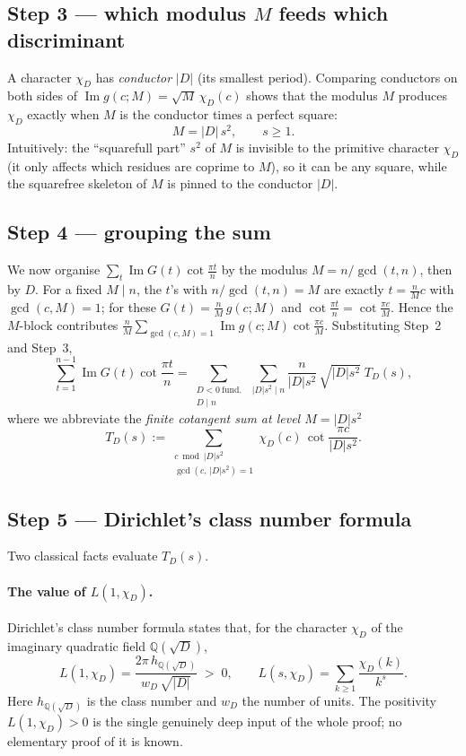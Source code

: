 \documentclass[11pt]{article}
\DeclareMathOperator{\Imag}{Im}
\begin{document}
\subsection{Step 3 --- which modulus $M$ feeds which discriminant}
A character $\chi_D$ has \emph{conductor} $|D|$ (its smallest period). Comparing conductors on both sides of
$\Imag g(c;M)=\sqrt M\,\chi_D(c)$ shows that the modulus $M$ produces $\chi_D$ exactly when $M$ is the conductor
times a perfect square:
\[
M=|D|\,s^2,\qquad s\ge1.
\]
Intuitively: the ``squarefull part'' $s^2$ of $M$ is invisible to the primitive character $\chi_D$ (it only
affects which residues are coprime to $M$), so it can be any square, while the squarefree skeleton of $M$ is
pinned to the conductor $|D|$.

\subsection{Step 4 --- grouping the sum}
We now organise $\sum_{t}\Imag G(t)\cot\frac{\pi t}{n}$ by the modulus $M=n/\gcd(t,n)$, then by $D$. For a fixed
$M\mid n$, the $t$'s with $n/\gcd(t,n)=M$ are exactly $t=\tfrac nM c$ with $\gcd(c,M)=1$; for these
$G(t)=\tfrac nM\,g(c;M)$ and $\cot\frac{\pi t}{n}=\cot\frac{\pi c}{M}$. Hence the $M$-block contributes
$\frac nM\sum_{\gcd(c,M)=1}\Imag g(c;M)\cot\frac{\pi c}{M}$. Substituting Step~2 and Step~3,
\[
\sum_{t=1}^{n-1}\Imag G(t)\cot\frac{\pi t}{n}
=\sum_{\substack{D<0\ \text{fund.}\\ D\mid n}}\ \sum_{|D|s^2\mid n}
\frac{n}{|D|s^2}\,\sqrt{|D|s^2}\;T_D(s),
\]
where we abbreviate the \emph{finite cotangent sum at level $M=|D|s^2$}
\[
T_D(s):=\sum_{\substack{c\bmod |D|s^2\\ \gcd(c,\,|D|s^2)=1}}\chi_D(c)\,\cot\frac{\pi c}{|D|s^2}.
\]

\subsection{Step 5 --- Dirichlet's class number formula}
Two classical facts evaluate $T_D(s)$.

\paragraph{The value of $L(1,\chi_D)$.}
Dirichlet's class number formula states that, for the character $\chi_D$ of the imaginary quadratic field
$\mathbb{Q}(\sqrt D)$,
\[
L(1,\chi_D)=\frac{2\pi\,h_{\mathbb{Q}(\sqrt D)}}{w_D\,\sqrt{|D|}}\;>\;0,
\qquad L(s,\chi_D)=\sum_{k\ge1}\frac{\chi_D(k)}{k^s}.
\]
Here $h_{\mathbb{Q}(\sqrt D)}$ is the class number and $w_D$ the number of units. The positivity
$L(1,\chi_D)>0$ is the single genuinely deep input of the whole proof; no elementary proof of it is known.
\end{document}

